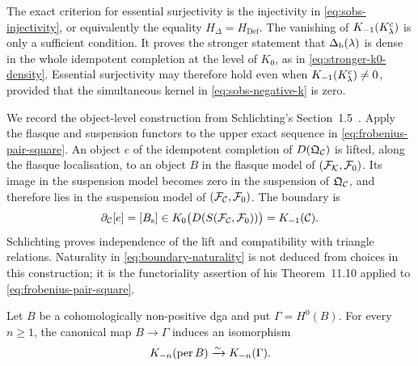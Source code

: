 \begin{remark}\label{rem:logical-asymmetry}
The exact criterion for essential surjectivity is the injectivity in \eqref{eq:sobs-injectivity}, or equivalently the equality \(H_\Delta=H_{\mathrm{Def}}\).  The vanishing of \(K_{-1}(K^c_\lambda)\) is only a sufficient condition.  It proves the stronger statement that \(\Delta_{\mathrm b}(\lambda)\) is dense in the whole idempotent completion at the level of \(K_0\), as in \eqref{eq:stronger-k0-density}.  Essential surjectivity may therefore hold even when \(K_{-1}(K^c_\lambda)\ne0\), provided that the simultaneous kernel in \eqref{eq:sobs-negative-k} is zero.
\end{remark}

\begin{remark}\label{rem:schlichting-boundary}
We record the object-level construction from Schlichting's Section~1.5~\cite{Schlichting06}.  Apply the flasque and suspension functors to the upper exact sequence in \eqref{eq:frobenius-pair-square}.  An object \(e\) of the idempotent completion of \(D(\mathfrak Q_{\mathcal C})\) is lifted, along the flasque localisation, to an object \(B\) in the flasque model of \((\mathcal F_{\mathcal K},\mathcal F_0)\).  Its image in the suspension model becomes zero in the suspension of \(\mathfrak Q_{\mathcal C}\), and therefore lies in the suspension model of \((\mathcal F_{\mathcal C},\mathcal F_0)\).  The boundary is
\[
 \partial_{\mathcal C}[e]=[B_{\mathrm s}]
 \in K_0\bigl(D(S(\mathcal F_{\mathcal C},\mathcal F_0))\bigr)
 =K_{-1}(\mathcal C).
\]
Schlichting proves independence of the lift and compatibility with triangle relations.  Naturality in \eqref{eq:boundary-naturality} is not deduced from choices in this construction; it is the functoriality assertion of his Theorem~11.10 applied to \eqref{eq:frobenius-pair-square}.
\end{remark}

\begin{lemma}\label{lem:connective-negative-k}
Let \(B\) be a cohomologically non-positive dga and put \(\Gamma=H^0(B)\).  For every \(n\ge1\), the canonical map \(B\to\Gamma\) induces an isomorphism
\[
 K_{-n}(\operatorname{per} B)\xrightarrow{\sim}K_{-n}(\Gamma).
\]
\end{lemma}

